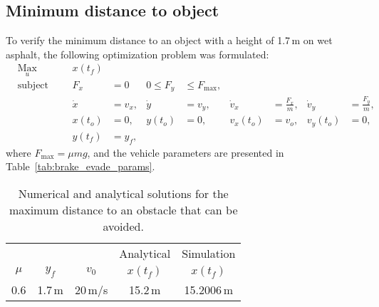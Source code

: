 \subsection{Minimum distance to object}
To verify the minimum distance to an object with a height of 1.7\,m on wet asphalt, the following optimization problem was formulated:
\begin{align}
    & \underset{u}{\text{Max}}
    & & & x(t_f)\\
%
    & \text{subject to} 
    & & & F_x &= 0 &0 \leq F_y &\leq F_{\text{max}},\\
%
    &&& & \dot x &= v_x, & \dot y &= v_y, & \dot v_x &= \frac{F_x}{m}, & \dot v_y &= \frac{F_y}{m},\\
%
    &&& & x(t_o) &= 0, & y(t_o) &= 0, & v_x(t_o) &= v_o, & v_y(t_o) &= 0,\\
    &&& & y(t_f) &= y_f,
\end{align}
where $F_{\text{max}} = \mu m g$, and the vehicle parameters are presented in Table~\ref{tab:brake_evade_params}.
\begin{table}[h!]
    \centering
    \begin{tabular}{c|c|c|c|c}
        & & & Analytical & Simulation\\
        $\mu$ & $y_f$ & $v_0$ & $x(t_f)$ & $x(t_f)$ \\
        \hline
        0.6 & 1.7\,m & 20\,m/s & 15.2\,m & 15.2006\,m\\
    \end{tabular}
    \caption{Numerical and analytical solutions for the maximum distance to an obstacle that can be avoided.}
\end{table}